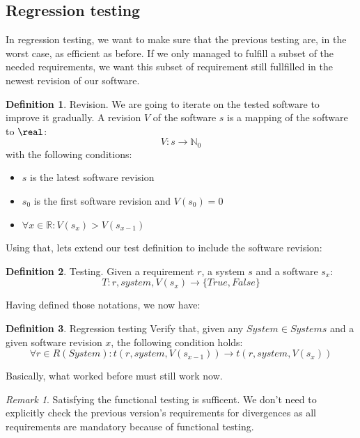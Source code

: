 \documentclass[12pt]{article}
\theoremstyle{definition}
\newtheorem{definition}{Definition}[section]
\theoremstyle{definition}
\theoremstyle{remark}
\newtheorem{remark}{Remark}[section]
\newcommand{\R}{\mathbb{R}}
\begin{document}
\subsection{Regression testing}


In regression testing, we want to make sure that the previous testing are, in the worst case, as efficient as before. If we only managed to fulfill a subset of the needed requirements, we want this subset of requirement still fullfilled in the newest revision of our software.

\theoremstyle{definition}
\begin{definition}{Revision.} We are going to iterate on the tested software to improve it gradually. A revision $V$ of the software $s$ is a mapping of the software to $\real$:
$$
V: s \to \mathbb{N}_0
$$
with the following conditions:
\begin{itemize}
\item $s$ is the latest software revision
\item $s_0$ is the first software revision and $V(s_0) = 0$
\item $\forall x \in \R: V(s_x) > V(s_{x-1})$
\end{itemize}
\end{definition}

Using that, lets extend our test definition to include the software revision:
\theoremstyle{definition}
\begin{definition}{Testing.} Given a requirement $r$, a system $s$ and a software $s_x$:
$$T: r, system,V(s_x) \to \{True, False\}$$
\end{definition}

Having defined those notations, we now have:

\theoremstyle{definition}
\begin{definition}{Regression testing} Verify that, given any $System \in Systems$ and a given software revision $x$, the following condition holds:
$$
\forall r \in R(System): t(r, system, V(s_{x-1})) \rightarrow t(r, system, V(s_x))
$$
\end{definition}

Basically, what worked before must still work now.

\theoremstyle{remark}
\begin{remark} Satisfying the functional testing is sufficent. We don't need to explicitly check the previous version's requirements for divergences as all requirements are mandatory because of functional testing.
\end{remark}
\end{document}
